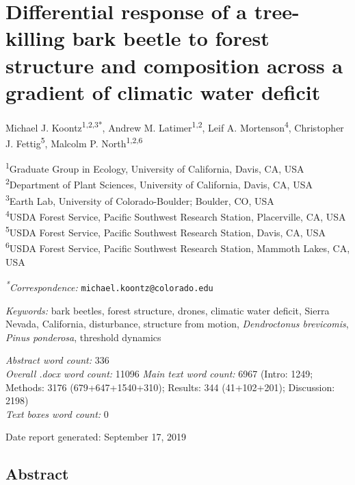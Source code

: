 \documentclass[]{article}
\title{}
\author{}
\date{}
\begin{document}
\hypertarget{differential-response-of-a-tree-killing-bark-beetle-to-forest-structure-and-composition-across-a-gradient-of-climatic-water-deficit}{%
\section{Differential response of a tree-killing bark beetle to forest
structure and composition across a gradient of climatic water
deficit}\label{differential-response-of-a-tree-killing-bark-beetle-to-forest-structure-and-composition-across-a-gradient-of-climatic-water-deficit}}

Michael J. Koontz\textsuperscript{1,2,3*}, Andrew M.
Latimer\textsuperscript{1,2}, Leif A. Mortenson\textsuperscript{4},
Christopher J. Fettig\textsuperscript{5}, Malcolm P.
North\textsuperscript{1,2,6}

\textsuperscript{1}Graduate Group in Ecology, University of California,
Davis, CA, USA\\
\textsuperscript{2}Department of Plant Sciences, University of
California, Davis, CA, USA\\
\textsuperscript{3}Earth Lab, University of Colorado-Boulder; Boulder,
CO, USA\\
\textsuperscript{4}USDA Forest Service, Pacific Southwest Research
Station, Placerville, CA, USA\\
\textsuperscript{5}USDA Forest Service, Pacific Southwest Research
Station, Davis, CA, USA\\
\textsuperscript{6}USDA Forest Service, Pacific Southwest Research
Station, Mammoth Lakes, CA, USA

\emph{\textsuperscript{*}Correspondence:}
\texttt{michael.koontz@colorado.edu}

\emph{Keywords:} bark beetles, forest structure, drones, climatic water
deficit, Sierra Nevada, California, disturbance, structure from motion,
\emph{Dendroctonus brevicomis}, \emph{Pinus ponderosa}, threshold
dynamics

\emph{Abstract word count:} 336\\
\emph{Overall .docx word count:} 11096 \emph{Main text word count:} 6967
(Intro: 1249; Methods: 3176 (679+647+1540+310); Results: 344
(41+102+201); Discussion: 2198)\\
\emph{Text boxes word count:} 0

Date report generated: September 17, 2019

\hypertarget{abstract}{%
\subsection{Abstract}\label{abstract}}
\end{document}
